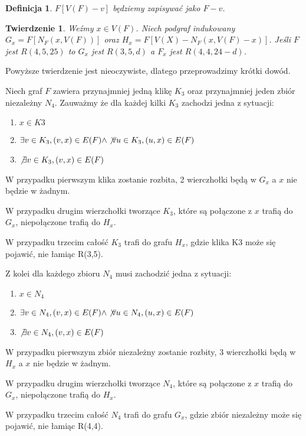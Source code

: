 \documentclass[11pt]{article}
\newtheorem{theorem}{Twierdzenie}
\newtheorem{definition}{Definicja}[section]
\begin{document}
\begin{definition}
  $F[V(F) - {v}]$ będziemy zapisywać jako $F - v$.
\end{definition}

\begin{theorem}
  Weźmy $x \in V(F)$. Niech podgraf indukowany $G_x = F[N_F(x,V(F))]$
  oraz $H_x = F[V(X) - N_F(x,V(F) - x)]$. Jeśli $F$ jest $R(4,5,25)$ to 
  $G_x$ jest $R(3,5,d)$ a $F_x$ jest $R(4,4,24-d)$.
\end{theorem}


Powyższe twierdzenie jest nieoczywiste, dlatego przeprowadzimy krótki dowód. 


  Niech graf $F$ zawiera przynajmniej jedną klikę $K_3$ oraz przynajmniej jeden zbiór niezależny $N_4$.
  Zauważmy że dla każdej kilki $K_3$ zachodzi jedna z sytuacji:
  \begin{enumerate}
    \item $x \in K3$
    \item $ \exists v \in K_3, (v, x) \in E(F) \land \not \forall u \in K_3, (u,x) \in E(F)$ 
    \item $\not \exists v \in K_3, (v, x) \in E(F)$
  \end{enumerate} 
  
  W przypadku pierwszym klika zostanie rozbita, 2 wierczhołki będą w $G_x$ a $x$ nie będzie w żadnym.
  
  W przypadku drugim wierzchołki tworzące $K_3$, które są połączone z $x$ trafią do $G_x$, niepołączone trafią do $H_x$.
  
  W przypadku trzecim całość $K_3$ trafi do grafu $H_x$, gdzie klika K3 może się pojawić, nie łamiąc R(3,5).

  Z kolei dla każdego zbioru $N_4$ musi zachodzić jedna z sytuacji:
  \begin{enumerate}
    \item $x \in N_4$
    \item $ \exists v \in N_4, (v, x) \in E(F) \land \not \forall u \in N_4, (u,x) \in E(F)$ 
    \item $\not \exists v \in N_4, (v, x) \in E(F)$
  \end{enumerate} 

  W przypadku pierwszym zbiór niezależny zostanie rozbity, 3 wierczhołki będą w $H_x$ a $x$ nie będzie w żadnym.
  
  W przypadku drugim wierzchołki tworzące $N_4$, które są połączone z $x$ trafią do $G_x$, niepołączone trafią do $H_x$.
  
  W przypadku trzecim całość $N_4$ trafi do grafu $G_x$, gdzie zbiór niezależny może się pojawić, nie łamiąc R(4,4).
\end{document}
